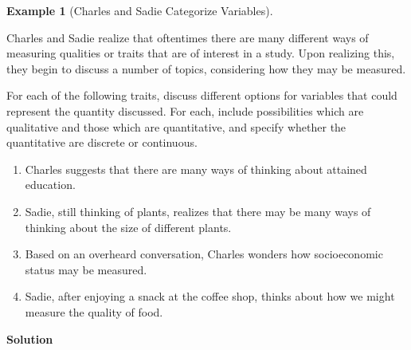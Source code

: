 \documentclass[
  letterpaper,
  DIV=11,
  numbers=noendperiod]{scrreprt}
\providecommand{\tightlist}{%
  \setlength{\itemsep}{0pt}\setlength{\parskip}{0pt}}\usepackage{longtable,booktabs,array}
\theoremstyle{definition}
\theoremstyle{definition}
\newtheorem{example}{Example}[chapter]
\theoremstyle{definition}
\theoremstyle{remark}
\begin{document}
\begin{example}[Charles and Sadie Categorize
Variables]\protect\hypertarget{exm-variable-type}{}\label{exm-variable-type}

Charles and Sadie realize that oftentimes there are many different ways
of measuring qualities or traits that are of interest in a study. Upon
realizing this, they begin to discuss a number of topics, considering
how they may be measured.

For each of the following traits, discuss different options for
variables that could represent the quantity discussed. For each, include
possibilities which are qualitative and those which are quantitative,
and specify whether the quantitative are discrete or continuous.

\begin{enumerate}
\def\labelenumi{\alph{enumi}.}
\tightlist
\item
  Charles suggests that there are many ways of thinking about attained
  education.
\item
  Sadie, still thinking of plants, realizes that there may be many ways
  of thinking about the size of different plants.
\item
  Based on an overheard conversation, Charles wonders how socioeconomic
  status may be measured.
\item
  Sadie, after enjoying a snack at the coffee shop, thinks about how we
  might measure the quality of food.
\end{enumerate}

\begin{tcolorbox}[enhanced jigsaw, colback=white, colframe=quarto-callout-color-frame, arc=.35mm, leftrule=.75mm, rightrule=.15mm, opacityback=0, breakable, bottomrule=.15mm, left=2mm, toprule=.15mm]

\vspace{-3mm}\textbf{Solution}\vspace{3mm}


\end{tcolorbox}
\end{example}
\end{document}
